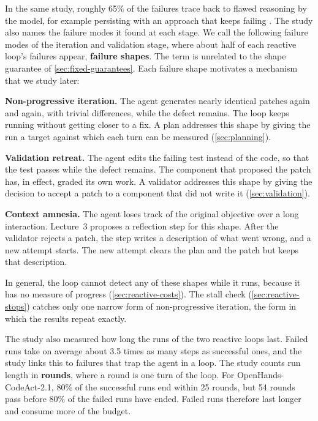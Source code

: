 In the same study, roughly 65\% of the failures trace back to flawed reasoning by the model, for
example persisting with an approach that keeps failing \citep{liu2025issuefailures}. The study also
names the failure modes it found at each stage. We call the following failure modes of the
iteration and validation stage, where about half of each reactive loop's failures appear,
\textbf{failure shapes}. The term is unrelated to the shape guarantee of \cref{sec:fixed-guarantees}. Each
failure shape motivates a mechanism that we study later:
\bi
\item \textbf{Non-progressive iteration.} The agent generates nearly identical patches again and
again, with trivial differences, while the defect remains. The loop keeps running without getting
closer to a fix. A plan addresses this shape by giving the run a target against which each turn can
be measured (\cref{sec:planning}).
\item \textbf{Validation retreat.} The agent edits the failing test instead of the code, so that the
test passes while the defect remains. The component that proposed the patch has, in effect, graded
its own work. A validator addresses this shape by giving the decision to accept a patch to a
component that did not write it (\cref{sec:validation}).
\item \textbf{Context amnesia.} The agent loses track of the original objective over a long
interaction. Lecture~3 proposes a reflection step for this shape. After the validator rejects a
patch, the step writes a description of what went wrong, and a new attempt starts. The new attempt
clears the plan and the patch but keeps that description.
\ei

In general, the loop cannot detect any of these shapes while it runs, because it has no measure of
progress (\cref{sec:reactive-costs}). The stall check (\cref{sec:reactive-stops}) catches only one
narrow form of non-progressive iteration, the form in which the results repeat exactly.

The study also measured how long the runs of the two reactive loops last. Failed runs take on
average about 3.5 times as many steps as successful ones, and the study links this to failures that
trap the agent in a loop. The study counts run length in \textbf{rounds}, where a round is one turn
of the loop. For OpenHands-CodeAct-2.1, 80\% of the successful runs end within 25 rounds, but 54
rounds pass before 80\% of the failed runs have ended. Failed runs therefore last longer and
consume more of the budget.


